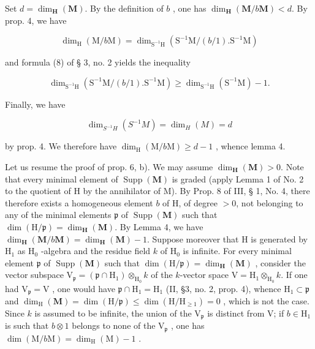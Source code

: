 Set \(d = \dim_{\mathbf{H}}(\mathbf{M})\). By the definition of \(b\) , one has \(\dim_{\mathbf{H}}(\mathbf{M}/b\mathbf{M}) < d\). By prop. 4, we have

\[
\dim_ {\mathrm{H}} (\mathrm{M} / b \mathrm{M}) = \dim_ {\mathrm{S} ^ {- 1} \mathrm{H}} \left(\mathrm{S} ^ {- 1} \mathrm{M} / (b / 1). \mathrm{S} ^ {- 1} \mathrm{M}\right)
\]

and formula (8) of § 3, no. 2 yields the inequality

\[
\dim_ {\mathrm{S} ^ {- 1} \mathrm{H}} (\mathrm{S} ^ {- 1} \mathrm{M} / (b / 1). \mathrm{S} ^ {- 1} \mathrm{M}) \geqslant \dim_ {\mathrm{S} ^ {- 1} \mathrm{H}} (\mathrm{S} ^ {- 1} \mathrm{M}) - 1.
\]

Finally, we have

\[
\dim_ {S ^ {- 1} H} (S ^ {- 1} M) = \dim_ {H} (M) = d
\]

by prop. 4. We therefore have \(\dim_{\mathrm{H}}(\mathrm{M}/b\mathrm{M}) \geqslant d - 1\) , whence lemma 4.

Let us resume the proof of prop. 6, b). We may assume \(\dim_{\mathbf{H}}(\mathbf{M}) > 0\). Note that every minimal element of \(\operatorname{Supp}(\mathbf{M})\) is graded (apply Lemma 1 of No. 2 to the quotient of H by the annihilator of M). By Prop. 8 of III, § 1, No. 4, there therefore exists a homogeneous element \(b\) of H, of degree \(>0\), not belonging to any of the minimal elements \(\mathfrak{p}\) of \(\operatorname{Supp}(\mathbf{M})\) such that \(\dim(\mathrm{H}/\mathfrak{p}) = \dim_{\mathbf{H}}(\mathbf{M})\). By Lemma 4, we have \(\dim_{\mathbf{H}}(\mathbf{M}/b\mathbf{M}) = \dim_{\mathbf{H}}(\mathbf{M}) - 1\). Suppose moreover that H is generated by \(\mathrm{H}_{1}\) as \(\mathrm{H}_{0}\) -algebra and the residue field \(k\) of \(\mathrm{H}_{0}\) is infinite. For every minimal element \(\mathfrak{p}\) of \(\operatorname{Supp}(\mathbf{M})\) such that \(\dim(\mathrm{H}/\mathfrak{p}) = \dim_{\mathbf{H}}(\mathbf{M})\) , consider the vector subspace \(\mathrm{V}_{\mathfrak{p}} = (\mathfrak{p} \cap \mathrm{H}_{1}) \otimes_{\mathrm{H}_{0}} k\) of the \(k\)-vector space \(\mathrm{V} = \mathrm{H}_{1} \otimes_{\mathrm{H}_{0}} k\). If one had \(\mathrm{V}_{\mathfrak{p}} = \mathrm{V}\) , one would have \(\mathfrak{p} \cap \mathrm{H}_1 = \mathrm{H}_1\) (II, §3, no. 2, prop. 4), whence \(\mathrm{H}_1 \subset \mathfrak{p}\) and \(\dim_{\mathrm{H}}(\mathbf{M}) = \dim(\mathrm{H}/\mathfrak{p}) \leqslant \dim(\mathrm{H}/\mathrm{H}_{\geqslant 1}) = 0\) , which is not the case. Since \(k\) is assumed to be infinite, the union of the \(\mathrm{V}_{\mathfrak{p}}\) is distinct from V; if \(b \in \mathrm{H}_1\) is such that \(b \otimes 1\) belongs to none of the \(\mathrm{V}_{\mathfrak{p}}\) , one has \(\dim(\mathrm{M}/b\mathrm{M}) = \dim_{\mathrm{H}}(\mathrm{M}) - 1\) .

